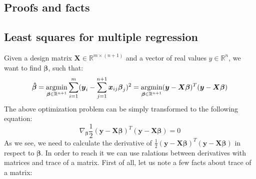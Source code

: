 \begin{appendices}

\chapter{Proofs and facts}

\section{Least squares for multiple regression}
\label{app:least}

Given a design matrix $\boldsymbol{X} \in \mathbb{R}^{m \times (n+1)}$ and a vector of real values $y \in \mathbb{R}^{n}$, we want to find $\boldsymbol{\beta}$, such that:
\begin{equation}
    \boldsymbol{\hat{\beta}} = \operatorname*{argmin}_{\boldsymbol{\beta} \in \mathbb{R}^{n+1}}\sum\limits_{i=1}^{m}(\boldsymbol{y}_i-\sum\limits_{j=1}^{n+1}\boldsymbol{x}_{ij}\boldsymbol{\beta}_j)^2 = \operatorname*{argmin}_{\boldsymbol{\beta} \in \mathbb{R}^{n+1}}(\boldsymbol{y}-\boldsymbol{X}\boldsymbol{\beta})^T(\boldsymbol{y}-\boldsymbol{X}\boldsymbol{\beta})
\end{equation}
The above optimization problem can be simply transformed to the following equation:
\begin{equation}\label{eq:least1}
    \nabla_{\boldsymbol{\beta}} \frac{1}{2}(\boldsymbol{y}-\boldsymbol{X}\boldsymbol{\beta})^T(\boldsymbol{y}-\boldsymbol{X}\boldsymbol{\beta}) = 0
\end{equation}
As we see, we need to calculate the derivative of $\frac{1}{2}(\boldsymbol{y}-\boldsymbol{X}\boldsymbol{\beta})^T(\boldsymbol{y}-\boldsymbol{X}\boldsymbol{\beta})$ in respect to $\boldsymbol{\beta}$. In order to reach it we can use ralations between derivatives with matrices and trace of a matrix. First of all, let us note a few facts about trace of a matrix:


\end{appendices}
